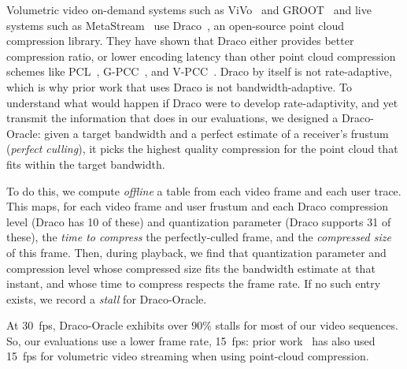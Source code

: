 %
Volumetric video on-demand systems such as ViVo~\cite{vivo} and GROOT~\cite{groot} and live systems such as MetaStream~\cite{metastream} use Draco~\cite{draco}, an open-source point cloud compression library.
%
They have shown that Draco either provides better compression ratio, or lower encoding latency than other point cloud compression schemes like PCL~\cite{pcl}, G-PCC~\cite{gpcc}, and V-PCC~\cite{vpcc}.
%
Draco by itself is not rate-adaptive, which is why prior work that uses Draco is not bandwidth-adaptive.
%
To understand what would happen if Draco were to develop rate-adaptivity, and yet transmit the information that \livo does in our evaluations, we designed a Draco-Oracle: given a target bandwidth and a perfect estimate of a receiver's frustum (\textit{perfect culling}), it picks the highest quality compression for the point cloud that fits within the target bandwidth.

To do this, we compute \textit{offline} a table from each video frame and each user trace.
%
This maps, for each video frame and user frustum and each Draco compression level (Draco has 10 of these) and quantization parameter (Draco supports 31 of these), the \textit{time to compress} the perfectly-culled frame, and the \textit{compressed size} of this frame.
%
Then, during playback, we find that quantization parameter and compression level whose compressed size fits the bandwidth estimate at that instant, and whose time to compress respects the frame rate.
%
If no such entry exists, we record a \textit{stall} for Draco-Oracle.

At 30~fps, Draco-Oracle exhibits over $90\%$ stalls for most of our video sequences.
%
So, our evaluations use a lower frame rate, 15~fps: prior work~\cite{livescan3d} has also used 15~fps for volumetric video streaming when using point-cloud compression.


